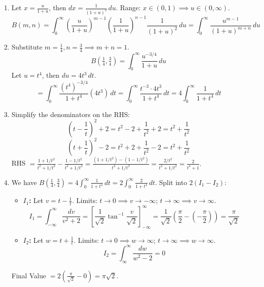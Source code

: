 \begin{solution}
\begin{enumerate}
    \item[(i)] Let $x = \frac{u}{1+u}$, then $dx = \frac{1}{(1+u)^2} \, du$. Range: $x \in (0,1) \implies u \in (0, \infty)$.
    $$ B(m,n) = \int_0^\infty \left(\frac{u}{1+u}\right)^{m-1} \left(\frac{1}{1+u}\right)^{n-1} \frac{1}{(1+u)^2} \, du = \int_0^\infty \frac{u^{m-1}}{(1+u)^{m+n}} \, du $$

    \item[(ii)] Substitute $m=\frac{1}{4}, n=\frac{3}{4} \implies m+n=1$.
    $$ B\left(\tfrac{1}{4}, \tfrac{3}{4}\right) = \int_0^\infty \frac{u^{-3/4}}{1+u} \, du $$
    Let $u = t^4$, then $du = 4t^3 \, dt$.
    $$ = \int_0^\infty \frac{(t^4)^{-3/4}}{1+t^4} (4t^3) \, dt = \int_0^\infty \frac{t^{-3} \cdot 4t^3}{1+t^4} \, dt = 4 \int_0^\infty \frac{1}{1+t^4} \, dt $$

    \item[(iii)] Simplify the denominators on the RHS:
    $$ \left(t-\frac{1}{t}\right)^2 + 2 = t^2 - 2 + \frac{1}{t^2} + 2 = t^2 + \frac{1}{t^2} $$
    $$ \left(t+\frac{1}{t}\right)^2 - 2 = t^2 + 2 + \frac{1}{t^2} - 2 = t^2 + \frac{1}{t^2} $$
    RHS $= \frac{1+1/t^2}{t^2+1/t^2} - \frac{1-1/t^2}{t^2+1/t^2} = \frac{(1+1/t^2) - (1-1/t^2)}{t^2+1/t^2} = \frac{2/t^2}{t^2+1/t^2} = \frac{2}{t^4+1}.$

    \item[(iv)] We have $B\left(\frac{1}{4}, \frac{3}{4}\right) = 4 \int_0^\infty \frac{1}{1+t^4} \, dt = 2 \int_0^\infty \frac{2}{1+t^4} \, dt$.
    Split into $2(I_1 - I_2)$:
    \begin{itemize}
        \item \textbf{$I_1$:} Let $v = t - \frac{1}{t}$. Limits: $t \to 0 \implies v \to -\infty$; $t \to \infty \implies v \to \infty$.
        $$ I_1 = \int_{-\infty}^\infty \frac{dv}{v^2+2} = \left[ \frac{1}{\sqrt{2}} \tan^{-1}\frac{v}{\sqrt{2}} \right]_{-\infty}^\infty = \frac{1}{\sqrt{2}} \left( \frac{\pi}{2} - (-\frac{\pi}{2}) \right) = \frac{\pi}{\sqrt{2}} $$
        \item \textbf{$I_2$:} Let $w = t + \frac{1}{t}$. Limits: $t \to 0 \implies w \to \infty$; $t \to \infty \implies w \to \infty$.
        $$ I_2 = \int_{\infty}^\infty \frac{dw}{w^2-2} = 0 $$
    \end{itemize}
    Final Value $= 2 \left( \frac{\pi}{\sqrt{2}} - 0 \right) = \pi\sqrt{2}$.
\end{enumerate}
\end{solution}

